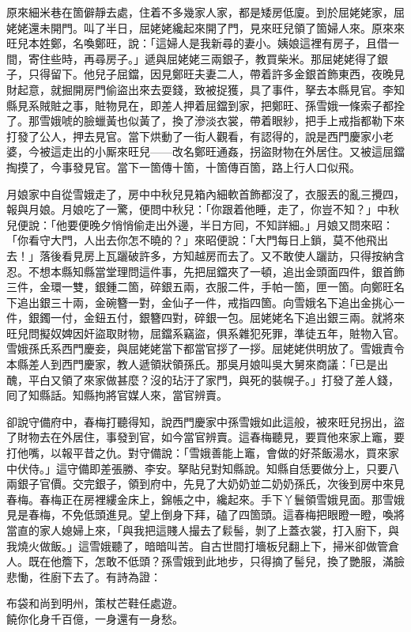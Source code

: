 原來細米巷在箇僻靜去處，住着不多幾家人家，都是矮房低廈。到於屈姥姥家，屈姥姥還未開門。叫了半日，屈姥姥纔起來開了門，見來旺兒領了箇婦人來。原來來旺兒本姓鄭，名喚鄭旺，說：「這婦人是我新尋的妻小。姨娘這裡有房子，且借一間，寄住些時，再尋房子。」遞與屈姥姥三兩銀子，教買柴米。那屈姥姥得了銀子，只得留下。他兒子屈鐺，因見鄭旺夫妻二人，帶着許多金銀首飾東西，夜晚見財起意，就掘開房門偷盜出來去耍錢，致被捉獲，具了事件，拏去本縣見官。李知縣見系賊賍之事，賍物見在，即差人押着屈鐺到家，把鄭旺、孫雪娥一條索子都拴了。那雪娥唬的臉蠟黃也似黃了，換了滲淡衣裳，帶着眼紗，把手上戒指都勒下來打發了公人，押去見官。當下烘動了一街人觀看，有認得的，說是西門慶家小老婆，今被這走出的小厮來旺兒——改名鄭旺通姦，拐盜財物在外居住。又被這屈鐺掏摸了，今事發見官。當下一箇傳十箇，十箇傳百箇，路上行人口似飛。{}

月娘家中自從雪娥走了，房中中秋兒見箱內細軟首飾都沒了，衣服丟的亂三攪四，報與月娘。月娘吃了一驚，便問中秋兒：「你跟着他睡，走了，你豈不知？」中秋兒便說：「他要便晚夕悄悄偷走出外邊，半日方囘，不知詳細。」月娘又問來昭：「你看守大門，人出去你怎不曉的？」來昭便說：「大門每日上鎖，莫不他飛出去！」落後看見房上瓦躧破許多，方知越房而去了。又不敢使人躧訪，只得按納含忍。不想本縣知縣當堂理問這件事，先把屈鐺夾了一頓，追出金頭面四件，銀首飾三件，金環一雙，銀鍾二箇，碎銀五兩，衣服二件，手帕一箇，匣一箇。向鄭旺名下追出銀三十兩，金碗簪一對，金仙子一件，戒指四箇。向雪娥名下追出金挑心一件，銀鐲一付，金鈕五付，銀簪四對，碎銀一包。屈姥姥名下追出銀三兩。就將來旺兒問擬奴婢因奸盜取財物，屈鐺系竊盜，俱系雜犯死罪，準徒五年，賍物入官。雪娥孫氏系西門慶妾，與屈姥姥當下都當官拶了一拶。屈姥姥供明放了。雪娥責令本縣差人到西門慶家，教人遞領狀領孫氏。那吳月娘叫吳大舅來商議：「已是出醜，平白又領了來家做甚麼？{}沒的玷汙了家門，與死的裝幌子。」打發了差人錢，囘了知縣話。知縣拘將官媒人來，當官辨賣。

卻說守備府中，春梅打聽得知，說西門慶家中孫雪娥如此這般，被來旺兒拐出，盜了財物去在外居住，事發到官，如今當官辨賣。這春梅聽見，要買他來家上竈，要打他嘴，以報平昔之仇。對守備說：「雪娥善能上竈，會做的好茶飯湯水，買來家中伏侍。」這守備即差張勝、李安。拏貼兒對知縣說。知縣自恁要做分上，只要八兩銀子官價。交完銀子，領到府中，先見了大奶奶並二奶奶孫氏，次後到房中來見春梅。春梅正在房裡縷金床上，錦帳之中，纔起來。{}手下丫鬟領雪娥見面。那雪娥見是春梅，不免低頭進見。望上倒身下拜，磕了四箇頭。這春梅把眼瞪一瞪，{}喚將當直的家人媳婦上來，「與我把這賤人撮去了鬏髻，剝了上蓋衣裳，打入廚下，與我燒火做飯。」這雪娥聽了，暗暗叫苦。自古世間打墻板兒翻上下，掃米卻做管倉人。既在他簷下，怎敢不低頭？孫雪娥到此地步，只得摘了髻兒，換了艷服，滿臉悲慟，徃廚下去了。有詩為證：

\begin{myquote}
布袋和尚到明州，策杖芒鞋任處遊。\\饒你化身千百億，一身還有一身愁。
\end{myquote}

